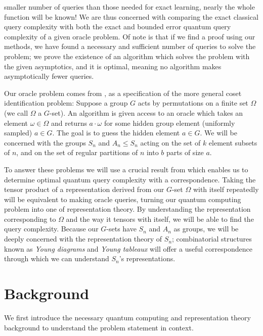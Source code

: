 \documentclass[12pt,twoside]{reedthesis}
\theoremstyle{plain}   %
\theoremstyle{definition}
\theoremstyle{remark}
\numberwithin{equation}{section}
\begin{document}
  smaller number of queries than those needed for exact learning, nearly the whole function will be known!
  We are thus concerned with comparing the exact classical query complexity with both the exact and bounded error quantum query complexity of a given oracle problem.
  Of note is that if we find a proof using our methods, we have found a necessary and sufficient number of queries to solve the problem;
  we prove the existence of an algorithm which solves the problem with the given asymptotics, and it is optimal,
  meaning no algorithm makes asymptotically fewer queries.
  \par
  Our oracle problem comes from \cite{copeland}, as a specification of the more general coset identification problem:
  Suppose a group $G$ acts by permutations on a finite set $\Omega$ (we call $\Omega$ a $G$-set).
  An algorithm is given access to an oracle which takes an element $\omega \in \Omega$ and returns $a \cdot \omega$ for some hidden group element (uniformly sampled) $a \in G$. The goal is to guess
  the hidden element $a \in G$.
  We will be concerned with the groups $S_n$ and $A_n \leq S_n$ acting on the set of $k$ element subsets of $n$, and on the set of regular partitions of $n$ into $b$ parts of size $a$.
  \par
  To answer these problems we will use a crucial result from \cite{copeland} which enables us to determine optimal quantum query complexity with a correspondence.
  Taking the tensor product of a representation derived from our $G$-set $\Omega$ with itself repeatedly will be equivalent to making oracle queries, turning our quantum computing problem
  into one of representation theory.
  By understanding the representation corresponding to $\Omega$ and the way it tensors with itself, we will be able to find the query complexity.
  Because our $G$-sets have $S_n$ and $A_n$ as groups, we will be deeply concerned with the representation theory of $S_n$;
  combinatorial structures known as \emph{Young diagrams} and \emph{Young tableaux} will offer a useful correspondence through which we can understand $S_n$'s representations.
  
  
  \chapter{Background}
  We first introduce the necessary quantum computing and representation theory background to understand the problem statement in context.
\end{document}

